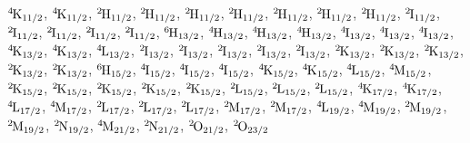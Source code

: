 \begin{mdframed}
\begin{center}
$\LSJterm{4}{K}{11/2}$, $\LSJterm{4}{K}{11/2}$, $\LSJterm{2}{H}{11/2}$, $\LSJterm{2}{H}{11/2}$, $\LSJterm{2}{H}{11/2}$, $\LSJterm{2}{H}{11/2}$, $\LSJterm{2}{H}{11/2}$, $\LSJterm{2}{H}{11/2}$, $\LSJterm{2}{H}{11/2}$, $\LSJterm{2}{I}{11/2}$, $\LSJterm{2}{I}{11/2}$, $\LSJterm{2}{I}{11/2}$, $\LSJterm{2}{I}{11/2}$, $\LSJterm{2}{I}{11/2}$, $\LSJterm{6}{H}{13/2}$, $\LSJterm{4}{H}{13/2}$, $\LSJterm{4}{H}{13/2}$, $\LSJterm{4}{H}{13/2}$, $\LSJterm{4}{I}{13/2}$, $\LSJterm{4}{I}{13/2}$, $\LSJterm{4}{I}{13/2}$, $\LSJterm{4}{K}{13/2}$, $\LSJterm{4}{K}{13/2}$, $\LSJterm{4}{L}{13/2}$, $\LSJterm{2}{I}{13/2}$, $\LSJterm{2}{I}{13/2}$, $\LSJterm{2}{I}{13/2}$, $\LSJterm{2}{I}{13/2}$, $\LSJterm{2}{I}{13/2}$, $\LSJterm{2}{K}{13/2}$, $\LSJterm{2}{K}{13/2}$, $\LSJterm{2}{K}{13/2}$, $\LSJterm{2}{K}{13/2}$, $\LSJterm{2}{K}{13/2}$, $\LSJterm{6}{H}{15/2}$, $\LSJterm{4}{I}{15/2}$, $\LSJterm{4}{I}{15/2}$, $\LSJterm{4}{I}{15/2}$, $\LSJterm{4}{K}{15/2}$, $\LSJterm{4}{K}{15/2}$, $\LSJterm{4}{L}{15/2}$, $\LSJterm{4}{M}{15/2}$, $\LSJterm{2}{K}{15/2}$, $\LSJterm{2}{K}{15/2}$, $\LSJterm{2}{K}{15/2}$, $\LSJterm{2}{K}{15/2}$, $\LSJterm{2}{K}{15/2}$, $\LSJterm{2}{L}{15/2}$, $\LSJterm{2}{L}{15/2}$, $\LSJterm{2}{L}{15/2}$, $\LSJterm{4}{K}{17/2}$, $\LSJterm{4}{K}{17/2}$, $\LSJterm{4}{L}{17/2}$, $\LSJterm{4}{M}{17/2}$, $\LSJterm{2}{L}{17/2}$, $\LSJterm{2}{L}{17/2}$, $\LSJterm{2}{L}{17/2}$, $\LSJterm{2}{M}{17/2}$, $\LSJterm{2}{M}{17/2}$, $\LSJterm{4}{L}{19/2}$, $\LSJterm{4}{M}{19/2}$, $\LSJterm{2}{M}{19/2}$, $\LSJterm{2}{M}{19/2}$, $\LSJterm{2}{N}{19/2}$, $\LSJterm{4}{M}{21/2}$, $\LSJterm{2}{N}{21/2}$, $\LSJterm{2}{O}{21/2}$, $\LSJterm{2}{O}{23/2}$
\end{center}
\end{mdframed}


